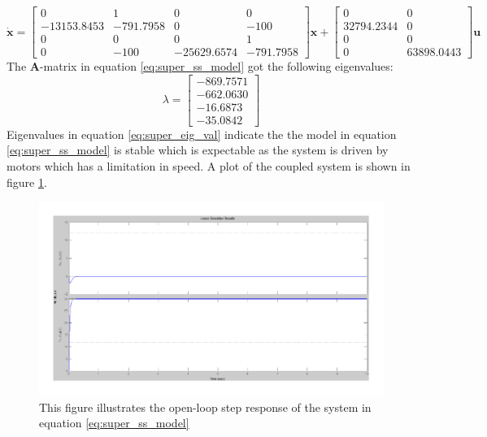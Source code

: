 \begin{equation}
 \dot{\textbf{x}} =
 \begin{bmatrix}
   0 & 1 & 0 & 0\\
   - 13153.8453 & - 791.7958 & 0 & - 100\\
   0 & 0 & 0 & 1\\
   0 & - 100 & - 25629.6574 & - 791.7958
 \end{bmatrix}
 \textbf{x} +
 \begin{bmatrix}
   0 & 0\\
   32794.2344 & 0\\
   0 & 0\\
   0 & 63898.0443
 \end{bmatrix}
 \textbf{u}\label{eq:super_ss_model}
\end{equation}
The \textbf{A}-matrix in equation \ref{eq:super_ss_model} got the following eigenvalues:
\begin{equation}
 \lambda =
 \begin{bmatrix}
   - 869.7571\\
   - 662.0630\\
   - 16.6873\\
   - 35.0842
 \end{bmatrix}\label{eq:super_eig_val}
\end{equation}
Eigenvalues in equation \ref{eq:super_eig_val} indicate the the model in equation \ref{eq:super_ss_model} is stable which is expectable as the system is driven by motors which has a limitation in speed. A plot of the coupled system is shown in figure \ref{fig:good_step}.
\begin{figure}[htb]
	\begin{center}
	\includegraphics[scale=1,trim=0 0 0 0]{graphics/GoodSim.pdf} %
	\caption{This figure illustrates the open-loop step response of the system in equation \ref{eq:super_ss_model}}
	\label{fig:good_step}			%
	\end{center}
\end{figure}
